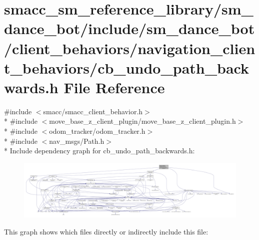 \hypertarget{smacc__sm__reference__library_2sm__dance__bot_2include_2sm__dance__bot_2client__behaviors_2navigea3702e6c2a754a75cc1a09c752b6e8e}{}\section{smacc\+\_\+sm\+\_\+reference\+\_\+library/sm\+\_\+dance\+\_\+bot/include/sm\+\_\+dance\+\_\+bot/client\+\_\+behaviors/navigation\+\_\+client\+\_\+behaviors/cb\+\_\+undo\+\_\+path\+\_\+backwards.h File Reference}
\label{smacc__sm__reference__library_2sm__dance__bot_2include_2sm__dance__bot_2client__behaviors_2navigea3702e6c2a754a75cc1a09c752b6e8e}
{\ttfamily \#include $<$smacc/smacc\+\_\+client\+\_\+behavior.\+h$>$}\\*
{\ttfamily \#include $<$move\+\_\+base\+\_\+z\+\_\+client\+\_\+plugin/move\+\_\+base\+\_\+z\+\_\+client\+\_\+plugin.\+h$>$}\\*
{\ttfamily \#include $<$odom\+\_\+tracker/odom\+\_\+tracker.\+h$>$}\\*
{\ttfamily \#include $<$nav\+\_\+msgs/\+Path.\+h$>$}\\*
Include dependency graph for cb\+\_\+undo\+\_\+path\+\_\+backwards.\+h\+:
\nopagebreak
\begin{figure}[H]
\begin{center}
\leavevmode
\includegraphics[width=350pt]{smacc__sm__reference__library_2sm__dance__bot_2include_2sm__dance__bot_2client__behaviors_2navig07ffbe817217c779fe39fd1d83c9d319}
\end{center}
\end{figure}
This graph shows which files directly or indirectly include this file\+:
\nopagebreak
